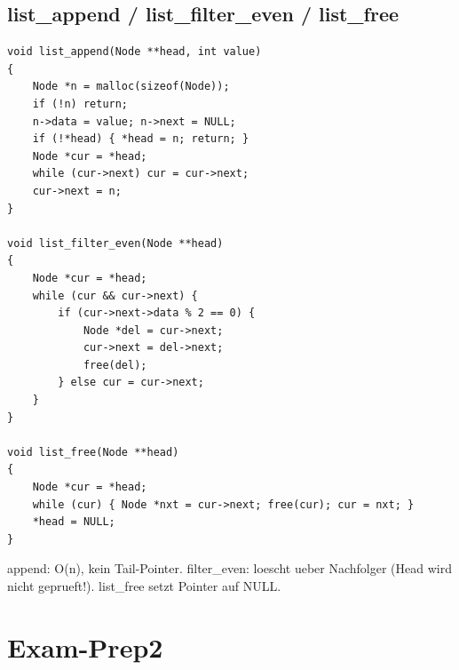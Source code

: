 \documentclass[10pt, a4paper]{article}
\begin{document}
\subsection{list\_append / list\_filter\_even / list\_free}
\begin{lstlisting}
void list_append(Node **head, int value)
{
    Node *n = malloc(sizeof(Node));
    if (!n) return;
    n->data = value; n->next = NULL;
    if (!*head) { *head = n; return; }
    Node *cur = *head;
    while (cur->next) cur = cur->next;
    cur->next = n;
}

void list_filter_even(Node **head)
{
    Node *cur = *head;
    while (cur && cur->next) {
        if (cur->next->data % 2 == 0) {
            Node *del = cur->next;
            cur->next = del->next;
            free(del);
        } else cur = cur->next;
    }
}

void list_free(Node **head)
{
    Node *cur = *head;
    while (cur) { Node *nxt = cur->next; free(cur); cur = nxt; }
    *head = NULL;
}
\end{lstlisting}
append: O(n), kein Tail-Pointer. filter\_even: loescht ueber Nachfolger (Head wird nicht geprueft!). list\_free setzt Pointer auf NULL.

\section{Exam-Prep2}
\end{document}
